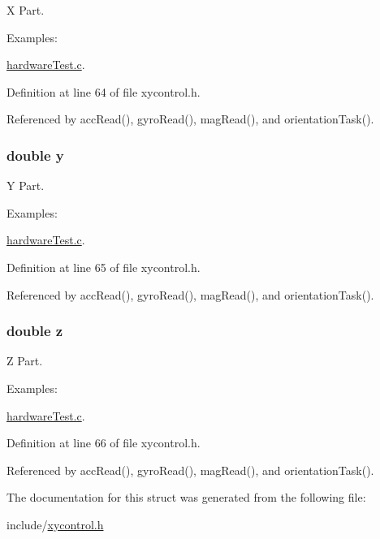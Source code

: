 X Part. 

\begin{Desc}
\item[Examples\-: ]\par
\hyperlink{hardware_test_8c-example}{hardware\-Test.\-c}.\end{Desc}


Definition at line 64 of file xycontrol.\-h.



Referenced by acc\-Read(), gyro\-Read(), mag\-Read(), and orientation\-Task().

\hypertarget{struct_vector3f_ab927965981178aa1fba979a37168db2a}{
\subsubsection[{y}]{\setlength{\rightskip}{0pt plus 5cm}double y}}\label{struct_vector3f_ab927965981178aa1fba979a37168db2a}


Y Part. 

\begin{Desc}
\item[Examples\-: ]\par
\hyperlink{hardware_test_8c-example}{hardware\-Test.\-c}.\end{Desc}


Definition at line 65 of file xycontrol.\-h.



Referenced by acc\-Read(), gyro\-Read(), mag\-Read(), and orientation\-Task().

\hypertarget{struct_vector3f_ab3e6ed577a7c669c19de1f9c1b46c872}{
\subsubsection[{z}]{\setlength{\rightskip}{0pt plus 5cm}double z}}\label{struct_vector3f_ab3e6ed577a7c669c19de1f9c1b46c872}


Z Part. 

\begin{Desc}
\item[Examples\-: ]\par
\hyperlink{hardware_test_8c-example}{hardware\-Test.\-c}.\end{Desc}


Definition at line 66 of file xycontrol.\-h.



Referenced by acc\-Read(), gyro\-Read(), mag\-Read(), and orientation\-Task().



The documentation for this struct was generated from the following file\-:\begin{DoxyCompactItemize}
\item 
include/\hyperlink{xycontrol_8h}{xycontrol.\-h}\end{DoxyCompactItemize}
